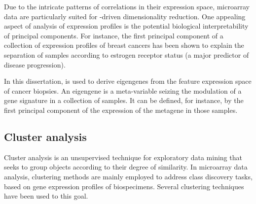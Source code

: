 Due to the intricate patterns of correlations in their expression space, microarray
data are particularly suited for -driven dimensionality
reduction.\cite{ringner_what_2008} One appealing aspect of 
analysis of expression profiles is the potential biological interpretability of
principal components.  For instance, the first principal component of a
collection of expression profiles of breast cancers has been shown to explain
the separation of samples according to estrogen receptor status (a major
predictor of disease progression).\cite{saal_poor_2007}

In this dissertation,  is used to derive eigengenes from the
feature expression space of cancer biopsies.  An eigengene is a meta-variable
seizing the modulation of a gene signature in a collection of samples.  It can
be defined, for instance, by the first principal component of the expression of
the metagene in those samples.







\subsection{Cluster analysis}
\label{sec:methods-clustering}
Cluster analysis is an unsupervised technique for exploratory data mining that
seeks to group objects according to their degree of similarity.  In microarray
data analysis, clustering methods are mainly employed to address class discovery
tasks, based on gene expression profiles of biospecimens.  Several clustering
techniques have been used to this goal.

